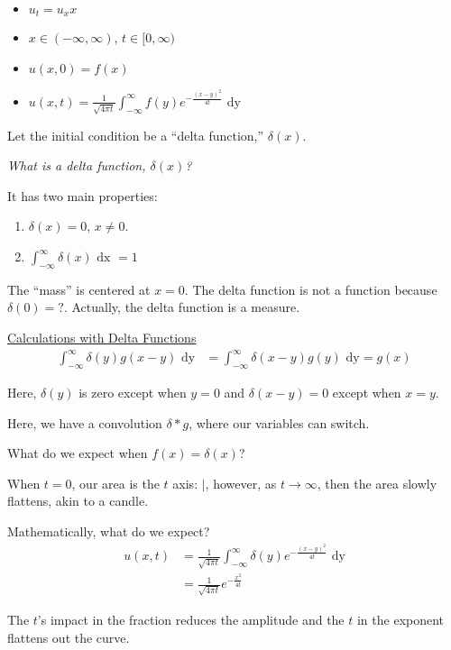 %
\begin{itemize}
  \item $u_t = u_xx$
  \item $x \in (-\infty, \infty)$, $t \in [0, \infty)$
  \item $u(x, 0) = f(x)$
  \item $\displaystyle u(x, t) = \frac{1}{\sqrt{4 \pi t}} \int^\infty_{-\infty} f(y) e^{- \frac{(x - y)^2}{4t}} \text{ dy}$
\end{itemize}

Let the initial condition be a ``delta function,'' $\delta(x)$.

\bigbreak

\emph{What is a delta function, $\delta(x)$?}

It has two main properties:
%
\begin{enumerate}
  \item $\delta(x) = 0$, $x \neq 0$.
  \item $\displaystyle \int^\infty_{-\infty} \delta(x) \text{ dx } = 1$
\end{enumerate}

The ``mass'' is centered at $x = 0$. The delta function is not a function because $\delta(0) = ?$. Actually, the delta function is a measure.

\underline{Calculations with Delta Functions}
%
\begin{align}
  \int^\infty_{-\infty} \delta(y) g(x - y) \text{ dy}
  & = \int^\infty_{-\infty} \delta(x- y) g(y) \text{ dy} = g(x)
\end{align}

Here, $\delta(y)$ is zero except when $y = 0$ and $\delta(x - y) = 0$ except when $x = y$.

Here, we have a convolution $\delta * g$, where our variables can switch.

What do we expect when $f(x) = \delta(x)$?

When $t = 0$, our area is the $t$ axis: $|$, however, as $t \to \infty$, then the area slowly flattens, akin to a candle.

Mathematically, what do we expect?
%
\begin{align}
  u(x, t) & = \frac{1}{\sqrt{4 \pi t}} \int^\infty_{-\infty} \delta(y) e^{- \frac{(x - y)^2}{4t}} \text{ dy}\\
  & = \frac{1}{\sqrt{4 \pi t}} e^{- \frac{x^2}{4 t}}
\end{align}

The $t$'s impact in the fraction reduces the amplitude and the $t$ in the exponent flattens out the curve.

